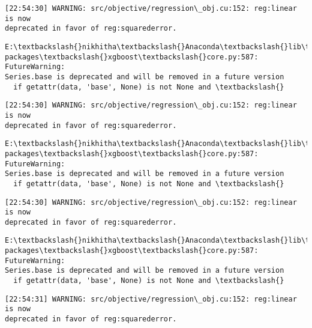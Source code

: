 \documentclass[11pt]{article}
\begin{document}
    \begin{Verbatim}[commandchars=\\\{\}]
[22:54:30] WARNING: src/objective/regression\_obj.cu:152: reg:linear is now
deprecated in favor of reg:squarederror.
    \end{Verbatim}

    \begin{Verbatim}[commandchars=\\\{\}]
E:\textbackslash{}nikhitha\textbackslash{}Anaconda\textbackslash{}lib\textbackslash{}site-packages\textbackslash{}xgboost\textbackslash{}core.py:587: FutureWarning:
Series.base is deprecated and will be removed in a future version
  if getattr(data, 'base', None) is not None and \textbackslash{}
    \end{Verbatim}

    \begin{Verbatim}[commandchars=\\\{\}]
[22:54:30] WARNING: src/objective/regression\_obj.cu:152: reg:linear is now
deprecated in favor of reg:squarederror.
    \end{Verbatim}

    \begin{Verbatim}[commandchars=\\\{\}]
E:\textbackslash{}nikhitha\textbackslash{}Anaconda\textbackslash{}lib\textbackslash{}site-packages\textbackslash{}xgboost\textbackslash{}core.py:587: FutureWarning:
Series.base is deprecated and will be removed in a future version
  if getattr(data, 'base', None) is not None and \textbackslash{}
    \end{Verbatim}

    \begin{Verbatim}[commandchars=\\\{\}]
[22:54:30] WARNING: src/objective/regression\_obj.cu:152: reg:linear is now
deprecated in favor of reg:squarederror.
    \end{Verbatim}

    \begin{Verbatim}[commandchars=\\\{\}]
E:\textbackslash{}nikhitha\textbackslash{}Anaconda\textbackslash{}lib\textbackslash{}site-packages\textbackslash{}xgboost\textbackslash{}core.py:587: FutureWarning:
Series.base is deprecated and will be removed in a future version
  if getattr(data, 'base', None) is not None and \textbackslash{}
    \end{Verbatim}

    \begin{Verbatim}[commandchars=\\\{\}]
[22:54:31] WARNING: src/objective/regression\_obj.cu:152: reg:linear is now
deprecated in favor of reg:squarederror.
    \end{Verbatim}
\end{document}

